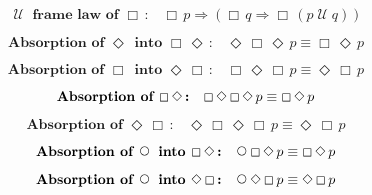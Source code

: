 \documentclass[12pt, fleqn, leqno]{article}
\newcommand{\impl}{\ensuremath{\Rightarrow}}        %
\newcommand{\Until}{\;\mathcal{U}\;}
\newcommand{\Next}{\;\,\text{\raisebox{3.5pt}{\circle{6}}}}
\newcommand{\Event}{\Diamond\,}
\newcommand{\Always}{\Box\,}
\newcommand{\spacer}{\vspace{-30pt}}
\begin{document}
\spacer

\begin{equation}\label{E:untilframelawAlways}
\textbf{$\Until$ frame law of $\Always$:}\quad \Always p \impl (\Always q \impl \Always (p \Until q))
\end{equation}

\spacer

\begin{equation}\label{E:absEvent}
\textbf{Absorption of $\Event$ into $\Always\Event$:}\quad \Event\Always\Event p \equiv \Always\Event p
\end{equation}

\spacer

\begin{equation}\label{E:absAlways}
\textbf{Absorption of $\Always$ into $\Event\Always$:}\quad \Always\Event\Always p \equiv \Event\Always p
\end{equation}

\spacer

\begin{equation}\label{E:absAlwaysEvent}
\textbf{Absorption of $ \Always\Event$:}\quad \Always \Event\Always\Event p \equiv \Always\Event p
\end{equation}

\spacer

\begin{equation}\label{E:absEventAlways}
\textbf{Absorption of $\Event \Always$:}\quad \Event \Always \Event\Always p \equiv \Event\Always p
\end{equation}

\spacer

\begin{equation}\label{E:absNextAlwaysEvent}
\textbf{Absorption of $\Next$ into $\Always\Event$:}\quad \Next\Always\Event p \equiv \Always\Event p
\end{equation}

\spacer

\begin{equation}\label{E:absNextEventAlways}
\textbf{Absorption of $\Next$ into $\Event\Always$:}\quad \Next\Event\Always p \equiv \Event\Always p
\end{equation}
\end{document}
